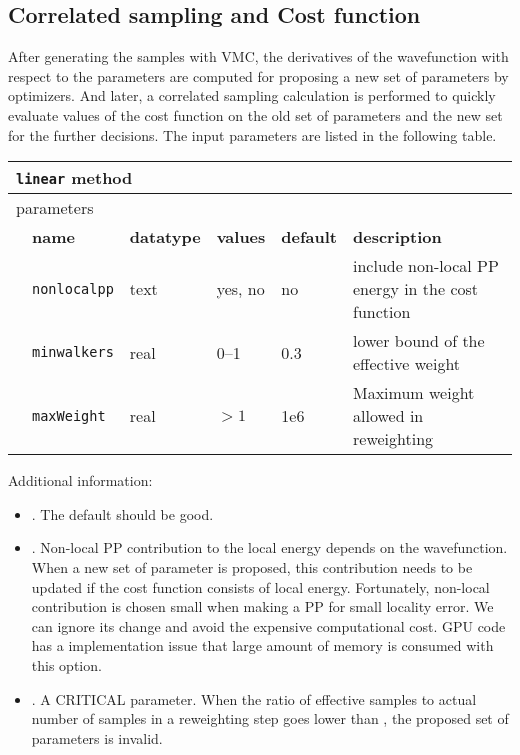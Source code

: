 \subsection{Correlated sampling and Cost function}
After generating the samples with VMC, the derivatives of the wavefunction with respect to the parameters are computed for proposing a new set of parameters by optimizers.
And later, a correlated sampling calculation is performed to quickly evaluate values of the cost function on the old set of parameters and the new set for the further decisions.
The input parameters are listed in the following table.
\begin{table}[h]
\begin{center}
\begin{tabularx}{\textwidth}{l l l l l l }
\hline
\multicolumn{6}{l}{\texttt{linear} method} \\
\hline
\multicolumn{2}{l}{parameters}  & \multicolumn{4}{l}{}\\
   &   \bfseries name     & \bfseries datatype & \bfseries values & \bfseries default   & \bfseries description \\
   &   \texttt{nonlocalpp} &  text     & yes, no & no  & include non-local PP energy in the cost function\\
   &   \texttt{minwalkers} &  real     & 0--1   & 0.3 & lower bound of the effective weight\\
   &   \texttt{maxWeight} &  real     & $>1$   & 1e6 & Maximum weight allowed in reweighting\\
  \hline
\end{tabularx}
\end{center}
\end{table}

Additional information:
\begin{itemize}
\item {}. The default should be good.
\item {}. Non-local PP contribution to the local energy depends on the wavefunction.
When a new set of parameter is proposed, this contribution needs to be updated if the cost function consists of local energy.
Fortunately, non-local contribution is chosen small when making a PP for small locality error.
We can ignore its change and avoid the expensive computational cost.
GPU code has a implementation issue that large amount of memory is consumed with this option.
\item {}. A CRITICAL parameter. When the ratio of effective samples to actual number of samples in a reweighting step goes lower than ,
the proposed set of parameters is invalid. %
\end{itemize}

